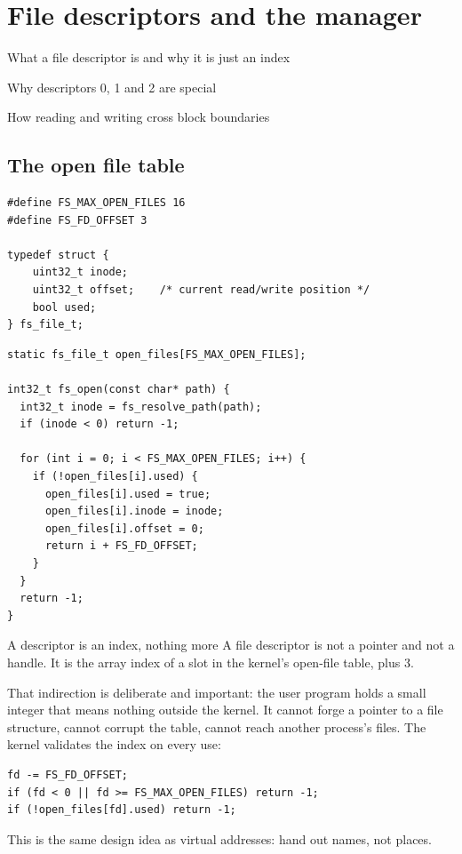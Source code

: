 \chapter{File descriptors and the manager}

\begin{goals}
  \item What a file descriptor is and why it is just an index
  \item Why descriptors 0, 1 and 2 are special
  \item How reading and writing cross block boundaries
\end{goals}

\section{The open file table}

\begin{lstlisting}[style=c]
#define FS_MAX_OPEN_FILES 16
#define FS_FD_OFFSET 3

typedef struct {
    uint32_t inode;
    uint32_t offset;    /* current read/write position */
    bool used;
} fs_file_t;
\end{lstlisting}

\begin{lstlisting}[style=c]
static fs_file_t open_files[FS_MAX_OPEN_FILES];

int32_t fs_open(const char* path) {
  int32_t inode = fs_resolve_path(path);
  if (inode < 0) return -1;

  for (int i = 0; i < FS_MAX_OPEN_FILES; i++) {
    if (!open_files[i].used) {
      open_files[i].used = true;
      open_files[i].inode = inode;
      open_files[i].offset = 0;
      return i + FS_FD_OFFSET;
    }
  }
  return -1;
}
\end{lstlisting}

\begin{concept}{A descriptor is an index, nothing more}
A file descriptor is not a pointer and not a handle. It is the array index of a slot in the kernel's
open-file table, plus 3.

That indirection is deliberate and important: the user program holds a small integer that means
nothing outside the kernel. It cannot forge a pointer to a file structure, cannot corrupt the table,
cannot reach another process's files. The kernel validates the index on every use:
\begin{lstlisting}[style=c]
fd -= FS_FD_OFFSET;
if (fd < 0 || fd >= FS_MAX_OPEN_FILES) return -1;
if (!open_files[fd].used) return -1;
\end{lstlisting}
This is the same design idea as virtual addresses: hand out names, not places.
\end{concept}

